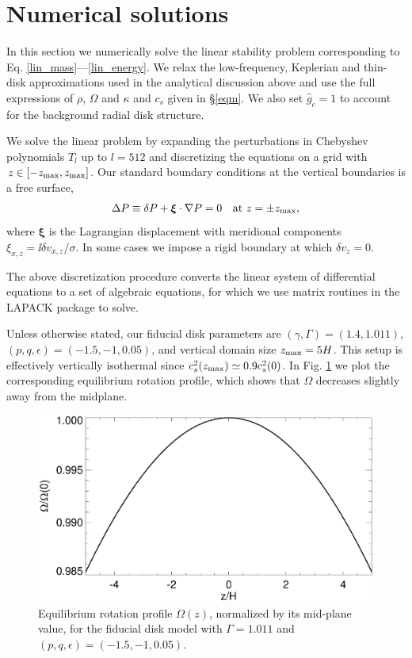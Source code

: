 \section{Numerical solutions}\label{numerical}
In this section we numerically solve the linear stability problem
corresponding to Eq. \ref{lin_mass}---\ref{lin_energy}. 
We relax the  low-frequency, Keplerian and thin-disk 
approximations used in the analytical discussion above and 
use the full expressions of $\rho$, $\Omega$ and 
$\kappa$ and $c_s$ given in \S\ref{eqm}. We also set $\hat{g}_c=1$ to   
account for the background radial disk structure.  

We solve the linear problem by expanding the 
perturbations in Chebyshev polynomials $T_l$ up to $l=512$
and discretizing the equations on a grid with
$z\in[-z_\mathrm{max},z_\mathrm{max}]$. Our standard boundary conditions at the vertical
boundaries is a free surface,  
\begin{align}
  \Delta P \equiv \delta P + \bm{\xi}\cdot\nabla P= 0 \quad \text{at } z=\pm z_\mathrm{max},
\end{align}
where $\bm{\xi}$ is the Lagrangian displacement with meridional 
components $\xi_{x,z} = \ii\delta v_{x,z}/\sigma$. In some cases we
impose a rigid boundary at which $\delta v_z=0$. 

The above discretization procedure
converts the linear system of differential equations to a set of 
algebraic equations, for which we use matrix routines in the LAPACK
package to solve. 

Unless otherwise stated, our fiducial disk parameters are 
$(\gamma, \Gamma) = (1.4, 1.011)$, $(p,q,\epsilon)=(-1.5,-1,0.05)$, and 
vertical domain size $z_\mathrm{max}=5H$. This setup is effectively vertically
isothermal since $c_s^2(z_\mathrm{max}) \simeq 0.9c_s^2(0)$. In Fig. \ref{omega_z}
we plot the corresponding equilibrium rotation profile, which shows
that $\Omega$ decreases slightly away from the midplane.   

\begin{figure}
  \includegraphics[width=\linewidth,clip=true,trim=0cm 0cm 0cm
  0cm]{figures/omega2} 
  \caption{Equilibrium rotation profile $\Omega(z)$,
    normalized by its mid-plane value, for  the fiducial disk model with $\Gamma=1.011$
    and $(p,q,\epsilon)=(-1.5,-1,0.05)$. 
    \label{omega_z} 
  }
\end{figure}

